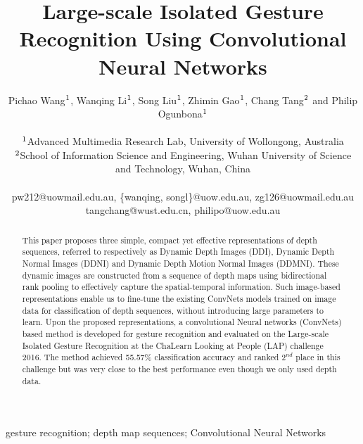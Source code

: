\documentclass[10pt, a4paper, conference]{IEEEtran}
\begin{document}
\title{Large-scale Isolated Gesture Recognition Using Convolutional Neural Networks}


\author{Pichao Wang$^{\rm 1}$, Wanqing Li$^{\rm 1}$, Song Liu$^{\rm 1}$, Zhimin Gao$^{\rm 1}$, Chang Tang$^{\rm 2}$ and Philip Ogunbona$^{\rm 1}$\\
\\
$^{\rm 1}$Advanced Multimedia Research Lab, University of Wollongong, Australia\\
$^{\rm 2}$School of Information Science and Engineering, Wuhan University of Science and Technology, Wuhan, China\\
\\
{ pw212@uowmail.edu.au, \{wanqing, songl\}@uow.edu.au, zg126@uowmail.edu.au}\\
{ tangchang@wust.edu.cn, philipo@uow.edu.au}
}






\maketitle


\begin{abstract}
This paper proposes three simple, compact yet effective representations of depth sequences, referred to respectively as Dynamic Depth Images (DDI), Dynamic Depth Normal Images (DDNI) and Dynamic Depth Motion Normal Images (DDMNI). These dynamic images are constructed from a sequence of depth maps using bidirectional rank pooling to effectively capture the spatial-temporal information. Such image-based representations enable us to fine-tune the existing ConvNets models trained on image data for classification of depth sequences, without introducing large parameters to learn. Upon the proposed representations, a convolutional Neural networks (ConvNets) based method is developed for gesture recognition and evaluated on the Large-scale Isolated Gesture Recognition at the ChaLearn Looking at People (LAP) challenge 2016. The method achieved 55.57\% classification accuracy and ranked $2^{nd}$ place in this challenge but was very close to the best performance even though we only used depth data.

\end{abstract}

\begin{IEEEkeywords}
gesture recognition; depth map sequences; Convolutional Neural Networks

\end{IEEEkeywords}
\end{document}
